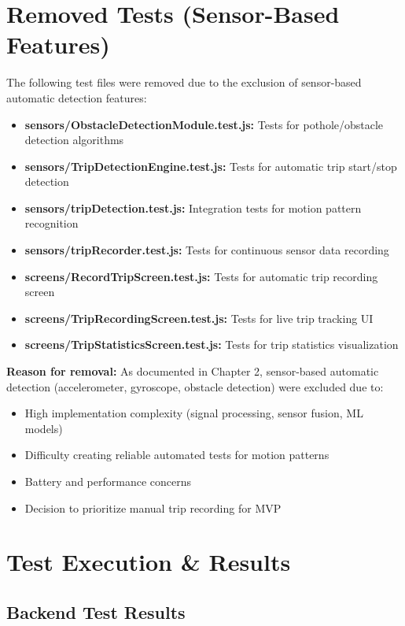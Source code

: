 \section{Removed Tests (Sensor-Based Features)}
\label{sec:removed_tests}

The following test files were removed due to the exclusion of sensor-based automatic detection features:

\begin{itemize}
    \item \textbf{sensors/ObstacleDetectionModule.test.js:} Tests for pothole/obstacle detection algorithms
    \item \textbf{sensors/TripDetectionEngine.test.js:} Tests for automatic trip start/stop detection
    \item \textbf{sensors/tripDetection.test.js:} Integration tests for motion pattern recognition
    \item \textbf{sensors/tripRecorder.test.js:} Tests for continuous sensor data recording
    \item \textbf{screens/RecordTripScreen.test.js:} Tests for automatic trip recording screen
    \item \textbf{screens/TripRecordingScreen.test.js:} Tests for live trip tracking UI
    \item \textbf{screens/TripStatisticsScreen.test.js:} Tests for trip statistics visualization
\end{itemize}

\textbf{Reason for removal:} As documented in Chapter 2, sensor-based automatic detection (accelerometer, gyroscope, obstacle detection) were excluded due to:
\begin{itemize}
    \item High implementation complexity (signal processing, sensor fusion, ML models)
    \item Difficulty creating reliable automated tests for motion patterns
    \item Battery and performance concerns
    \item Decision to prioritize manual trip recording for MVP
\end{itemize}

\section{Test Execution \& Results}
\label{sec:test_execution}

\subsection{Backend Test Results}
\label{subsec:backend_test_results}

